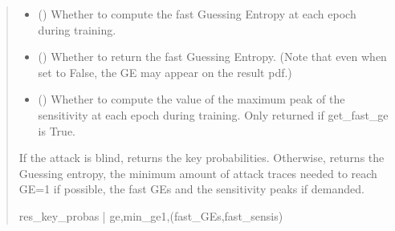 \documentclass[letterpaper,10pt,english]{sphinxmanual}
\begin{document}
\begin{fulllineitems}
\begin{fulllineitems}
\begin{quote}
\begin{description}
\begin{itemize}
\item {} 
\sphinxAtStartPar
{} (\sphinxstyleliteralemphasis{\sphinxupquote{, }}) \textendash{} Whether to compute the fast Guessing Entropy at each epoch during
training.

\item {} 
\sphinxAtStartPar
{} (\sphinxstyleliteralemphasis{\sphinxupquote{, }}) \textendash{} Whether to return the fast Guessing Entropy. (Note that even when set
to False, the GE may appear on the result pdf.)

\item {} 
\sphinxAtStartPar
{} (\sphinxstyleliteralemphasis{\sphinxupquote{, }}) \textendash{} Whether to compute the value of the maximum peak of the sensitivity at
each epoch during training. Only returned if get\_fast\_ge is True.

\end{itemize}

\sphinxAtStartPar
If the attack is blind, returns the key probabilities.
Otherwise, returns the Guessing entropy, the minimum amount of attack
traces needed to reach GE=1 if possible, the fast GEs and the sensitivity
peaks if demanded.

\sphinxAtStartPar
res\_key\_probas | ge,min\_ge1,(fast\_GEs,fast\_sensis)

\end{description}\end{quote}

\end{fulllineitems}



\end{fulllineitems}
\end{document}
